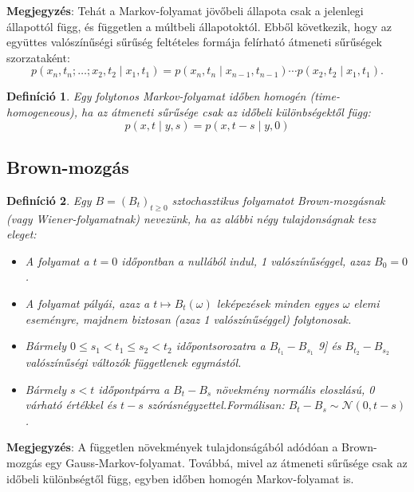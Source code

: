 \documentclass[12pt, a4paper]{article}
\newtheorem{definition}{Definíció}[subsection]
\begin{document}
\noindent\textbf{Megjegyzés}: Tehát a Markov-folyamat jövőbeli állapota csak a jelenlegi állapottól függ, és független a múltbeli állapotoktól. Ebből következik, hogy az együttes valószínűségi sűrűség feltételes formája felírható átmeneti sűrűségek szorzataként:
\[
p(x_n, t_n; \dots; x_2, t_2 \mid x_1, t_1) = p(x_n, t_n \mid x_{n-1}, t_{n-1}) \cdots p(x_2, t_2 \mid x_1, t_1).
\]

\begin{definition}\label{def_tizedik}
Egy folytonos Markov-folyamat időben homogén (time-homogeneous), ha az átmeneti sűrűsége csak az időbeli különbségektől függ:
\[
p(x,t \mid y,s) = p(x, t-s \mid y,0)
\]
\end{definition}

\subsection{Brown-mozgás}

\begin{definition}\label{def_tizenegyedik}
\cite{pitera2020} Egy $B = (B_t)_{t \ge 0}$ sztochasztikus folyamatot Brown-mozgásnak (vagy Wiener-folyamatnak) nevezünk, ha az alábbi négy tulajdonságnak tesz eleget:
\begin{itemize}
    \item A folyamat a $t=0$ időpontban a nullából indul, 1 valószínűséggel, azaz $B_0 = 0$.
    \item A folyamat pályái, azaz a $t \mapsto B_t(\omega)$ leképezések minden egyes $\omega$ elemi eseményre, majdnem biztosan (azaz 1 valószínűséggel) folytonosak.
    \item Bármely $0 \le s_1 < t_1 \le s_2 < t_2$ időpontsorozatra a $B_{t_1} - B_{s_1}$ 9] és $B_{t_2} - B_{s_2}$ valószínűségi változók függetlenek egymástól.
    \item Bármely $s < t$ időpontpárra a $B_t - B_s$ növekmény normális eloszlású, 0 várható értékkel és $t-s$ szórásnégyzettel.Formálisan: $B_t - B_s \sim \mathcal{N}(0, t-s)$.
\end{itemize}
\end{definition}

\textbf{Megjegyzés}: A független növekmények tulajdonságából adódóan a Brown-mozgás egy Gauss-Markov-folyamat. Továbbá, mivel az átmeneti sűrűsége csak az időbeli különbségtől függ, egyben időben homogén Markov-folyamat is.
\end{document}
